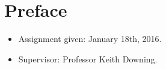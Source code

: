 \section*{Preface}


\begin{itemize}
\item Assignment given: January 18th, 2016.
\item Supervisor: Professor Keith Downing.
\end{itemize}